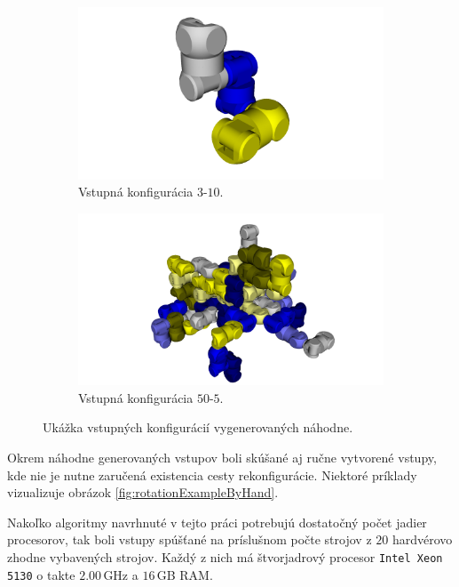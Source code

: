 \documentclass[
  digital, %
  oneside, %
  table,   %
  lof,     %
  nolot,     %
]{fithesis3}
\begin{document}
\begin{figure}[hbt!]
    \centering
    \begin{subfigure}[b]{0.47\textwidth}
        \includegraphics[width=\textwidth]{pictures/3-10-init.png}
        \caption[3-10-init]{Vstupná konfigurácia $3$-$10$.}
        \label{fig:3-10-init}
    \end{subfigure}
    \begin{subfigure}[b]{0.47\textwidth}
        \includegraphics[width=\textwidth]{pictures/50-5-init.png}
        \caption[50-5-init]{Vstupná konfigurácia $50$-$5$.}
    \end{subfigure}
    \caption[Ukážkové vstupné konfigurácie]{Ukážka vstupných konfigurácií vygenerovaných náhodne. }
    \label{fig:rofibotExamples}
\end{figure}

Okrem náhodne generovaných vstupov boli skúšané aj ručne vytvorené vstupy, kde nie je nutne zaručená existencia cesty rekonfigurácie. Niektoré príklady vizualizuje obrázok \ref{fig:rotationExampleByHand}. 

Nakoľko algoritmy navrhnuté v tejto práci potrebujú dostatočný počet jadier procesorov, tak boli vstupy spúšťané na príslušnom počte strojov z $20$ hardvérovo zhodne vybavených strojov. Každý z nich má štvorjadrový procesor \texttt{Intel Xeon 5130} o takte $2.00$\,GHz a $16$\,GB RAM. 
\end{document}
